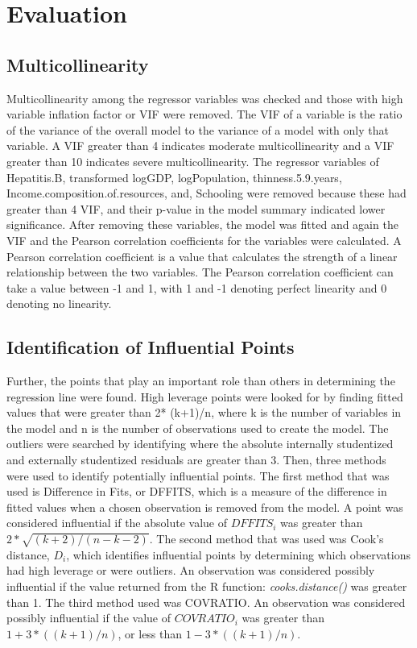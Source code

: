 \section{Evaluation}
\label{sec:evaluation}

\subsection{Multicollinearity}
\label{sec:multicollinearity}
Multicollinearity among the regressor variables was checked and those with high variable inflation factor or VIF were removed. The VIF of a variable is the ratio of the variance of the overall model to the variance of a model with only that variable. A VIF greater than 4 indicates moderate multicollinearity and a VIF greater than 10 indicates severe multicollinearity. The regressor variables of Hepatitis.B, transformed logGDP, logPopulation, thinness.5.9.years, Income.composition.of.resources, and, Schooling were removed because these had greater than 4 VIF, and their p-value in the model summary indicated lower significance. 
After removing these variables, the model was fitted and again the VIF and the Pearson correlation coefficients for the variables were calculated. A Pearson correlation coefficient is a value that calculates the strength of a linear relationship between the two variables. The Pearson correlation coefficient can take a value between -1 and 1, with 1 and -1 denoting perfect linearity and 0 denoting no linearity.

\subsection{Identification of Influential Points}
\label{sec:influential-points}
Further, the points that play an important role than others in determining the regression line were found. High leverage points were looked for by finding fitted values that were greater than 2* (k+1)/n, where k is the number of variables in the model and n is the number of observations used to create the model. The outliers were searched by identifying where the absolute internally studentized and externally studentized residuals are greater than 3. Then, three methods were used to identify potentially influential points. The first method that was used is Difference in Fits, or DFFITS, which is a measure of the difference in fitted values when a chosen observation is removed from the model. A point was considered influential if the absolute value of $DFFITS_i$ was greater than $2* \sqrt{(k+2)/(n-k-2)}$. The second method that was used was Cook’s distance, $D_i$, which identifies influential points by determining which observations had high leverage or were outliers. An observation was considered possibly influential if the value returned from the R function: \textit{cooks.distance()} was greater than 1. The third method used was COVRATIO. An observation was considered possibly influential if the value of $COVRATIO_i$ was greater than $1+ 3*((k+1)/n)$, or less than $1- 3*((k+1)/n)$.

